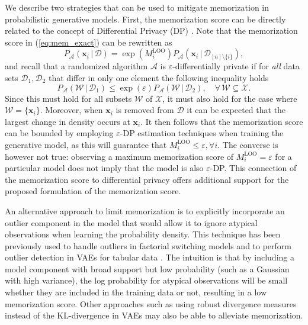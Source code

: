 \documentclass{article}
\newcommand{\bft}[1]{\mathbf{#1}}
\newcommand{\given}{\,|\,}
\begin{document}
We describe two strategies that can be used to mitigate memorization in 
probabilistic generative models. First, the memorization score can be directly 
related to the concept of Differential Privacy (DP) 
\cite{dwork2006calibrating,dwork2014algorithmic}. Note that the memorization 
score in (\ref{eq:mem_exact}) can be rewritten as
\begin{equation}
	P_{\mathcal{A}}(\bft{x}_i \given \mathcal{D}) = \exp(M^{\text{LOO}}_i) 
	P_{\mathcal{A}}(\bft{x}_i \given \mathcal{D}_{[n] \setminus \{i\}}),
\end{equation}
and recall that a randomized algorithm $\mathcal{A}$ is 
$\varepsilon$-differentially private if for \emph{all} data sets 
$\mathcal{D}_1, \mathcal{D}_2$ that differ in only one element the following 
inequality holds
\begin{equation}
	P_{\mathcal{A}}(\mathcal{W} \given \mathcal{D}_1) \leq 
	\exp(\varepsilon) P_{\mathcal{A}}(\mathcal{W} \given 
	\mathcal{D}_2),\quad \forall\, \mathcal{W} \subseteq \mathcal{X}.
\end{equation}
Since this must hold for all subsets $\mathcal{W}$ of $\mathcal{X}$, it must 
also hold for the case where $\mathcal{W} = \{ \bft{x}_i \}$. Moreover, when 
$\bft{x}_i$ is removed from $\mathcal{D}$ it can be expected that the largest 
change in density occurs at $\bft{x}_i$. It then follows that the memorization 
score can be bounded by employing $\varepsilon$-DP estimation techniques when 
training the generative model, as this will guarantee that $M^{\text{LOO}}_i 
\leq \varepsilon, \forall i$. The converse is however not true: observing a 
maximum memorization score of $M^{\text{LOO}}_i = \varepsilon$ for a 
particular model does not imply that the model is also $\varepsilon$-DP.  This 
connection of the memorization score to differential privacy offers additional 
support for the proposed formulation of the memorization score.

An alternative approach to limit memorization is to explicitly incorporate an 
outlier component in the model that would allow it to ignore atypical 
observations when learning the probability density. This technique has been 
previously used to handle outliers in factorial switching models 
\cite{quinn2009factorial} and to perform outlier detection in VAEs for tabular 
data \cite{eduardo2020robust}. The intuition is that by including a model 
component with broad support but low probability (such as a Gaussian with high 
variance), the log probability for atypical observations will be small whether 
they are included in the training data or not, resulting in a low memorization 
score. Other approaches such as using robust divergence measures instead of 
the KL-divergence in VAEs \cite{akrami2019robust} may also be able to 
alleviate memorization.
\end{document}
